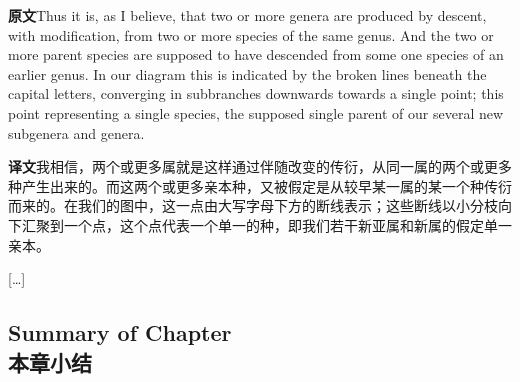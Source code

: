 \documentclass[UTF8,zihao=-4]{ctexart}
\newcommand{\BodyFont}{\fontsize{10.5pt}{15.5pt}\selectfont}
\newcommand{\origlabel}{\textbf{原文}\quad}
\newcommand{\translabel}{\textbf{译文}\quad}
\newenvironment{enblock}{\par\noindent\begingroup\BodyFont\origlabel}{\par\endgroup}
\newenvironment{zhblock}{\par\noindent\begingroup\BodyFont\translabel}{\par\endgroup\vspace{0.35em}}
\newcommand{\pair}[2]{\begin{enblock}#1\end{enblock}\begin{zhblock}#2\end{zhblock}}
\begin{document}
\pair{Thus it is, as I believe, that two or more genera are produced by descent, with modification, from two or more species of the same genus. And the two or more parent species are supposed to have descended from some one species of an earlier genus. In our diagram this is indicated by the broken lines beneath the capital letters, converging in subbranches downwards towards a single point; this point representing a single species, the supposed single parent of our several new subgenera and genera.}{我相信，两个或更多属就是这样通过伴随改变的传衍，从同一属的两个或更多种产生出来的。而这两个或更多亲本种，又被假定是从较早某一属的某一个种传衍而来的。在我们的图中，这一点由大写字母下方的断线表示；这些断线以小分枝向下汇聚到一个点，这个点代表一个单一的种，即我们若干新亚属和新属的假定单一亲本。}

\begin{center}
[\ldots]
\end{center}

\subsection*{Summary of Chapter\\本章小结}
\end{document}

